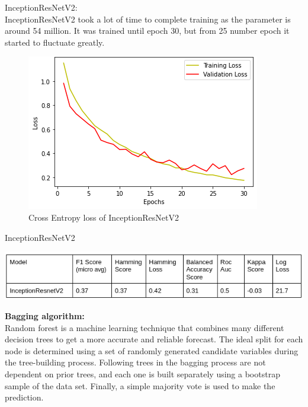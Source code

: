\documentclass[sigconf]{acmart}
\begin{document}
InceptionResNetV2:\\
InceptionResNetV2 took a lot of time to complete training as the parameter is around 54 million. It was trained until epoch 30, but from 25 number epoch it started to fluctuate greatly.\\
\begin{figure}[h]
  \centering

  \includegraphics[width=\linewidth]{../supplements/8.Inception_Resnet.png}
 
     \caption{Cross Entropy loss of InceptionResNetV2}
  \label{Tab.4}
\end{figure}

\begin{table}[h]
  \centering
   \caption{InceptionResNetV2}
  \includegraphics[width=\linewidth]{../supplements/InceptionResNetV2.png}
 
  \label{Tab.4}
\end{table}

\textbf{Bagging algorithm:}\\
Random forest is a machine learning technique that combines many different decision trees to get a more accurate and reliable forecast. The ideal split for each node is determined using a set of randomly generated candidate variables during the tree-building process. Following trees in the bagging process are not dependent on prior trees, and each one is built separately using a bootstrap sample of the data set. Finally, a simple majority vote is used to make the prediction.
\end{document}
